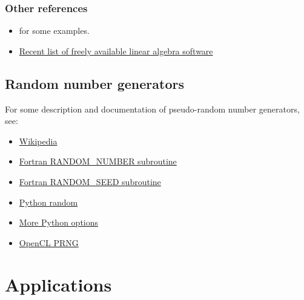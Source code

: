 \documentclass[letterpaper,10pt,english]{sphinxmanual}
\begin{document}
\subsection{Other references}
\label{linalg:other-references}\begin{itemize}
\item {} 
 for some examples.

\item {} 
\href{http://www.netlib.org/utk/people/JackDongarra/la-sw.html}{Recent list of freely available linear algebra software}

\end{itemize}


\section{Random number generators}
\label{random:random-number-generators}\label{random:random}\label{random::doc}
For some description and documentation of pseudo-random number generators,
see:
\begin{itemize}
\item {} 
\href{https://en.wikipedia.org/wiki/Pseudorandom\_number\_generator}{Wikipedia}

\item {} 
\href{http://gcc.gnu.org/onlinedocs/gfortran/RANDOM\_005fNUMBER.html}{Fortran RANDOM\_NUMBER subroutine}

\item {} 
\href{http://gcc.gnu.org/onlinedocs/gfortran/RANDOM\_005fSEED.html\#RANDOM\_005fSEED}{Fortran RANDOM\_SEED subroutine}

\item {} 
\href{http://docs.python.org/2/library/random.html}{Python random}

\item {} 
\href{http://docs.scipy.org/doc/numpy/reference/routines.random.html}{More Python options}

\item {} 
\href{http://mira.math.udel.edu/ParallelKMC/doku.php?id=software}{OpenCL PRNG}

\end{itemize}


\chapter{Applications}
\label{index:applications}\label{index:toc-apps}
\end{document}
